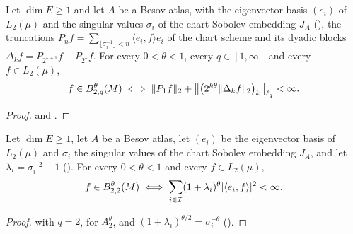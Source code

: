 \begin{corollary}
\label{cor:spectral-besov-manifold-blocks}
\leanok
{}
Let $\dim E \geq 1$ and let $A$ be a Besov atlas, with the eigenvector basis $(e_i)$ of
$L_2(\mu)$ and the singular values $\sigma_i$ of the chart Sobolev embedding $J_A$
(), the truncations
$P_n f = \sum_{\lfloor \sigma_i^{-1} \rfloor < n} \langle e_i, f \rangle e_i$ of the chart scheme
and its dyadic blocks $\Delta_k f = P_{2^{k+1}} f - P_{2^k} f$. For every $0 < \theta < 1$,
every $q \in [1, \infty]$ and every $f \in L_2(\mu)$,
\[
  f \in B^{\theta}_{2,q}(M) \iff
  \|P_1 f\|_2 + \bigl\| \bigl(2^{k\theta} \|\Delta_k f\|_2\bigr)_k \bigr\|_{\ell_q} < \infty .
\]
\end{corollary}

\begin{proof}
\leanok
{} and .
\end{proof}

\begin{corollary}
\label{cor:spectral-sobolev-manifold}
\leanok
{}
Let $\dim E \geq 1$, let $A$ be a Besov atlas, let $(e_i)$ be the eigenvector basis of
$L_2(\mu)$ and $\sigma_i$ the singular values of the chart Sobolev embedding $J_A$, and let
$\lambda_i = \sigma_i^{-2} - 1$ (). For every $0 < \theta < 1$ and
every $f \in L_2(\mu)$,
\[
  f \in B^{\theta}_{2,2}(M) \iff
  \sum_{i \in \mathcal{I}} (1 + \lambda_i)^\theta |\langle e_i, f \rangle|^2 < \infty .
\]
\end{corollary}

\begin{proof}
\leanok
{} with $q = 2$,  for
$A^\theta_2$, and $(1 + \lambda_i)^{\theta/2} = \sigma_i^{-\theta}$ ().
\end{proof}

